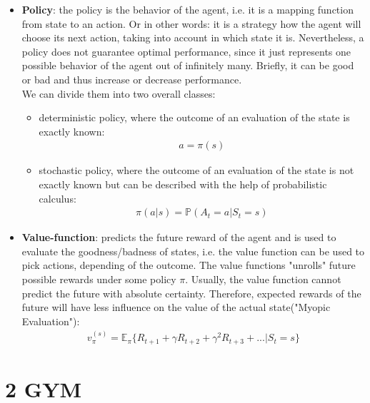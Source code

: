 \documentclass[a4paper, 11pt]{article}
\begin{document}
\begin{itemize}
\begin{itemize}
	\end{itemize}
    \item \textbf{Policy}: the policy is the behavior of the agent, i.e. it is a mapping function from state to an action. Or in other words: it is a strategy how the agent will choose its next action, taking into account in which state it is. Nevertheless, a policy does not guarantee optimal performance, since it just represents one possible behavior of the agent out of infinitely many. Briefly, it can be good or bad and thus increase or decrease performance.\\
     We can divide them into two overall classes:
    \begin{itemize}
    	\item deterministic policy, where the outcome of an evaluation of the state is exactly known: \\ 
    	\begin{align*}
    	a = \pi(s)
    	\end{align*}
    	\item stochastic policy, where the outcome of an evaluation of the state is not exactly known but can be described with the help of probabilistic calculus:\\
    	\begin{align*}
    		\pi( a | s) = \mathbb{P}(A_t =a | S_t = s)
    	\end{align*}
    \end{itemize}
    \vspace{0.5cm}
    \item \textbf{Value-function}: predicts the future reward of the agent and is used to evaluate the goodness/badness of states, i.e. the value function can be used to pick actions, depending of the outcome. The value functions "unrolls" future possible rewards under some policy $\pi$. Usually, the value function cannot predict the future with absolute certainty. Therefore, expected rewards of the future will have less influence on the value of the actual state("Myopic Evaluation"):\\
    \begin{align*}
    	v_{\pi} ^{(s)} = \mathbb{E}_{\pi} \lbrace R_{t+1}+ \gamma R_{t+2} + \gamma ^2 R_{t+3}+... | S_t = s \rbrace
    \end{align*}
\end{itemize}
\clearpage


\section*{2 GYM}

\lipsum[1]
\end{document}
